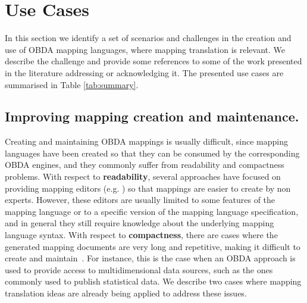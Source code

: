 \section{Use Cases}
In this section we identify a set of scenarios and challenges in the creation and use of OBDA mapping languages, where mapping translation is relevant. We describe the challenge and provide some references to some of the work presented in the literature addressing or acknowledging it. The presented use cases are summarised in Table \ref{tab:summary}.

\begin{table}[h]
\centering
\caption{Summary of mapping translation approaches}
\label{tab:summary}
\end{table}



\subsection{Improving mapping creation and maintenance.}

Creating and maintaining OBDA mappings is usually difficult, since mapping languages have been created so that they can be consumed by the corresponding OBDA engines, and they commonly suffer from readability and compactness problems. With respect to \textbf{readability}, several approaches have focused on providing mapping editors (e.g. \citep{heyvaert2016rmleditor}) so that mappings are easier to create by non experts. However, these editors are usually limited to some features of the mapping language or to a specific version of the mapping language specification, and in general they still require knowledge about the underlying mapping language syntax. With respect to \textbf{compactness}, there are cases where the generated mapping documents are very long and repetitive, making it difficult to create and maintain~\citep{chaves2018virtual}. For instance, this is the case when an OBDA approach is used to provide access to multidimensional data sources, such as the ones commonly used to publish statistical data. We describe two cases where mapping translation ideas are already being applied to address these issues. 

